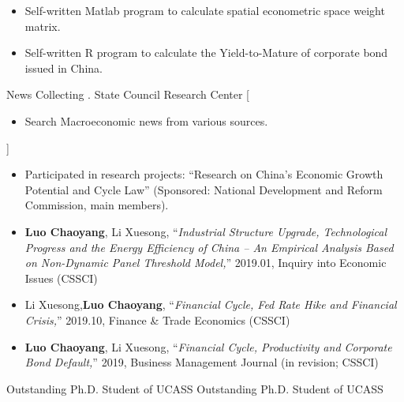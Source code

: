 \documentclass{resume}
\begin{document}
\begin{itemize}
  \item Self-written Matlab program to calculate spatial econometric space weight matrix.
  \item Self-written R program to calculate the Yield-to-Mature of corporate bond issued in China.

\end{itemize}

\begin{experiences}
    {News Collecting \@. State Council Research Center}%
    [\begin{itemize}
      \item Search Macroeconomic news from various sources.
    \end{itemize}]%

\end{experiences}

\begin{itemize}
  \small
  \item Participated in research projects:
    \enquote{Research on China's Economic Growth Potential and Cycle Law} (Sponsored: National Development and Reform Commission, main members).
  \item \textbf{Luo Chaoyang}, Li Xuesong,
    \enquote{\it Industrial Structure Upgrade, Technological Progress and the Energy Efficiency of China -- An Empirical Analysis Based on Non-Dynamic Panel Threshold Model,}
    2019.01, Inquiry into Economic Issues (CSSCI)
  \item Li Xuesong,\textbf{Luo Chaoyang},
    \enquote{\it Financial Cycle, Fed Rate Hike and Financial Crisis,}
    2019.10, Finance \& Trade Economics (CSSCI)
  \item \textbf{Luo Chaoyang}, Li Xuesong,
    \enquote{\it Financial Cycle, Productivity and Corporate Bond Default,}
    2019, Business Management Journal (in revision; CSSCI)
\end{itemize}

\begin{entries}
    {Outstanding Ph.D. Student of UCASS}
    {Outstanding Ph.D. Student of UCASS}
\end{entries}
\end{document}
